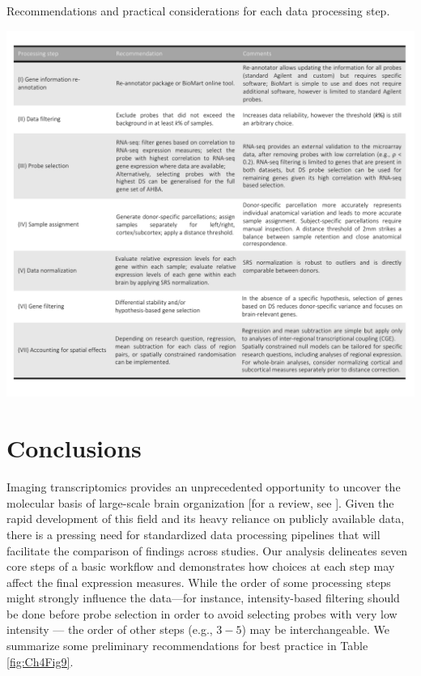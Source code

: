 \begin{table}[H]
\caption{Recommendations and practical considerations for each data processing step.}
  \centering
    \includegraphics[width=1\textwidth]{Chapter4/Ch4Fig9.pdf}
\label{fig:Ch4Fig9}
\end{table}

\section{Conclusions}

Imaging transcriptomics provides an unprecedented opportunity to uncover the molecular basis of large-scale brain organization [for a review, see \citep{Fornito2019}]. Given the rapid development of this field and its heavy reliance on publicly available data, there is a pressing need for standardized data processing pipelines that will facilitate the comparison of findings across studies. Our analysis delineates seven core steps of a basic workflow and demonstrates how choices at each step may affect the final expression measures. While the order of some processing steps might strongly influence the data---for instance, intensity-based filtering should be done before probe selection in order to avoid selecting probes with very low intensity — the order of other steps (e.g., $3-5$) may be interchangeable. We summarize some preliminary recommendations for best practice in Table \ref{fig:Ch4Fig9}.

